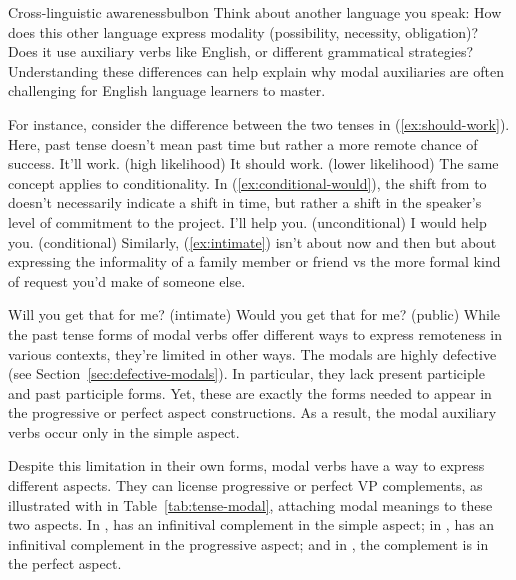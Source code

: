 \begin{tblsfilledsymbol}{Cross-linguistic awareness}{bulbon}
Think about another language you speak: How does this other language express modality (possibility, necessity, obligation)? Does it use auxiliary verbs like English, or different grammatical strategies? Understanding these differences can help explain why modal auxiliaries are often challenging for English language learners to master.
\end{tblsfilledsymbol}
\noindent For instance, consider the difference between the two tenses in (\ref{ex:should-work}). Here, past tense doesn't mean past time but rather a more remote chance of success.
\ea\label{ex:should-work}
\ea It'll work. \hfill(high likelihood)
\ex It should work. \hfill(lower likelihood)
\z\z
The same concept applies to conditionality. In (\ref{ex:conditional-would}), the shift from  to  doesn't necessarily indicate a shift in time, but rather a shift in the speaker's level of commitment to the project.
\ea\label{ex:conditional-would}
\ea I'll help you. \hfill(unconditional)
\ex I would help you. \hfill(conditional)
\z\z
Similarly, (\ref{ex:intimate}) isn't about now and then but about expressing the informality of a family member or friend vs the more formal kind of request you'd make of someone else.

\ea \label{ex:intimate}
\ea Will you get that for me? \hfill(intimate)
\ex Would you get that for me? \hfill(public)
\z
\z{}
While the past tense forms of modal verbs offer different ways to express remoteness in various contexts, they're limited in other ways. The modals are highly defective (see Section~\ref{sec:defective-modals}). In particular, they lack present participle and past participle forms. Yet, these are exactly the forms needed to appear in the progressive or perfect aspect constructions. As a result, the modal auxiliary verbs occur only in the simple aspect.

Despite this limitation in their own forms, modal verbs have a way to express different aspects. They can license progressive or perfect VP complements, as illustrated with  in Table~\ref{tab:tense-modal}, attaching modal meanings to these two aspects. In ,  has an infinitival complement in the simple aspect; in ,  has an infinitival complement in the progressive aspect; and in , the complement is in the perfect aspect.

